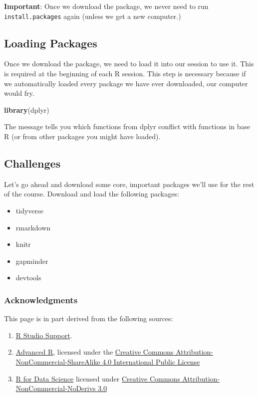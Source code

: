 \documentclass[]{book}
\newenvironment{Shaded}{\begin{snugshade}}{\end{snugshade}}
\newcommand{\KeywordTok}[1]{\textcolor[rgb]{0.13,0.29,0.53}{\textbf{#1}}}
\newcommand{\NormalTok}[1]{#1}
\providecommand{\tightlist}{%
  \setlength{\itemsep}{0pt}\setlength{\parskip}{0pt}}
\begin{document}
\textbf{Important}: Once we download the package, we never need to run
\texttt{install.packages} again (unless we get a new computer.)

\subsection{Loading Packages}\label{loading-packages}

Once we download the package, we need to load it into our session to use
it. This is required at the beginning of each R session. This step is
necessary because if we automatically loaded every package we have ever
downloaded, our computer would fry.

\begin{Shaded}
\begin{Highlighting}[]
\KeywordTok{library}\NormalTok{(dplyr)}
\end{Highlighting}
\end{Shaded}

The message tells you which functions from dplyr conflict with functions
in base R (or from other packages you might have loaded).

\subsection{Challenges}\label{challenges-1}

Let's go ahead and download some core, important packages we'll use for
the rest of the course. Download and load the following packages:

\begin{itemize}
\tightlist
\item
  tidyverse
\item
  rmarkdown
\item
  knitr
\item
  gapminder
\item
  devtools
\end{itemize}

\subsubsection*{Acknowledgments}\label{acknowledgments-2}

This page is in part derived from the following sources:

\begin{enumerate}
\def\labelenumi{\arabic{enumi}.}
\item
  \href{https://support.rstudio.com/hc/en-us/articles/200484448}{R
  Studio Support}.
\item
  \href{https://adv-r.hadley.nz/}{Advanced R}, licensed under the
  \href{https://creativecommons.org/licenses/by-nc-sa/4.0/}{Creative
  Commons Attribution-NonCommercial-ShareAlike 4.0 International Public
  License}
\item
  \href{https://r4ds.had.co.nz}{R for Data Science} licensed under
  \href{https://creativecommons.org/licenses/by-nc-nd/3.0/us/}{Creative
  Commons Attribution-NonCommercial-NoDerivs 3.0}
\end{enumerate}
\end{document}
